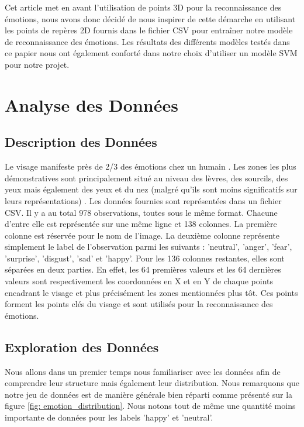 \documentclass{rapport}
\begin{document}
Cet article met en avant l'utilisation de points 3D pour la reconnaissance des émotions, nous avons donc décidé de nous inspirer de cette démarche en utilisant
les points de repères 2D fournis dans le fichier CSV pour entraîner notre modèle de reconnaissance des émotions. Les résultats des différents modèles testés dans
ce papier nous ont également conforté dans notre choix d'utiliser un modèle SVM pour notre projet.

\section{Analyse des Données}
\subsection{Description des Données}

Le visage manifeste près de 2/3 des émotions chez un humain \cite{koBriefReviewFacial2018}.
Les zones les plus démonstratives sont principalement situé au niveau des lèvres, des sourcils, des yeux mais
également des yeux et du nez (malgré qu'ils sont moins significatifs sur leurs
représentations) \cite{koBriefReviewFacial2018}. Les données fournies sont représentées dans
un fichier CSV. Il y a au total 978 observations, toutes sous le même format. Chacune
d'entre elle est représentée sur une même ligne et 138 colonnes. La première colonne
est réservée pour le nom de l'image. La deuxième colonne représente simplement le
label de l'observation parmi les suivants : 'neutral', 'anger', 'fear', 'surprise', 'disgust', 'sad' et 'happy'.
Pour les 136 colonnes restantes, elles sont séparées en deux parties. En effet, les 64 premières valeurs et les 64 dernières
valeurs sont respectivement les coordonnées en X et en Y de chaque points
encadrant le visage et plus précisément les zones mentionnées plus tôt. Ces points forment les points clés du visage
et sont utilisés pour la reconnaissance des émotions.

\subsection{Exploration des Données}

Nous allons dans un premier temps nous familiariser avec les données afin de comprendre leur structure
mais également leur distribution. Nous remarquons que notre jeu de données est de manière générale bien
réparti comme présenté sur la figure \ref*{fig: emotion_distribution}. Nous notons tout de même une quantité
moins importante de données pour les labels 'happy' et 'neutral'.
\end{document}
